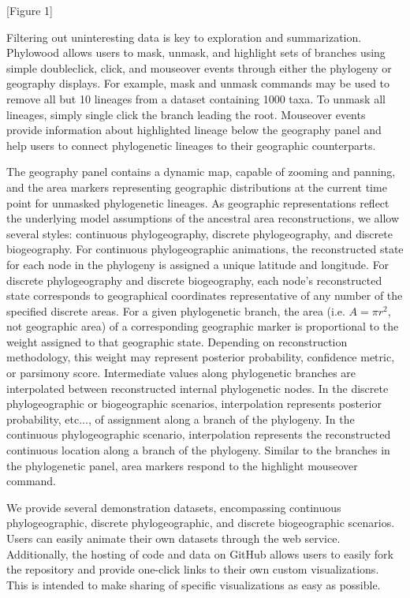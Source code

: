 \documentclass[11pt]{article}
\begin{document}
\begin{center}
[Figure 1]
\end{center}

Filtering out uninteresting data is key to exploration and summarization. Phylowood allows users to mask, unmask, and highlight sets of branches using simple doubleclick, click, and mouseover events through either the phylogeny or geography displays. For example, mask and unmask commands may be used to remove all but 10 lineages from a dataset containing 1000 taxa. To unmask all lineages, simply single click the branch leading the root. Mouseover events provide information about highlighted lineage below the geography panel and help users to connect phylogenetic lineages to their geographic counterparts.

The geography panel contains a dynamic map, capable of zooming and panning, and the area markers representing geographic distributions at the current time point for unmasked phylogenetic lineages. As geographic representations reflect the underlying model assumptions of the ancestral area reconstructions, we allow several styles: continuous phylogeography, discrete phylogeography, and discrete biogeography. For continuous phylogeographic animations, the reconstructed state for each node in the phylogeny is assigned a unique latitude and longitude. For discrete phylogeography and discrete biogeography, each node's reconstructed state corresponds to geographical coordinates representative of any number of the specified discrete areas. For a given phylogenetic branch, the area (i.e. $A = \pi r^2$, not geographic area) of a corresponding geographic marker is proportional to the weight assigned to that geographic state. Depending on reconstruction methodology, this weight may represent posterior probability, confidence metric, or parsimony score. Intermediate values along phylogenetic branches are interpolated between reconstructed internal phylogenetic nodes. In the discrete phylogeographic or biogeographic scenarios, interpolation represents posterior probability, etc..., of assignment along a branch of the phylogeny. In the continuous phylogeographic scenario, interpolation represents the reconstructed continuous location along a branch of the phylogeny. Similar to the branches in the phylogenetic panel, area markers respond to the highlight mouseover command.

We provide several demonstration datasets, encompassing continuous phylogeographic, discrete phylogeographic, and discrete biogeographic scenarios. Users can easily animate their own datasets through the web service. Additionally, the hosting of code and data on GitHub allows users to easily fork the repository and provide one-click links to their own custom visualizations. This is intended to make sharing of specific visualizations as easy as possible.
\end{document}
